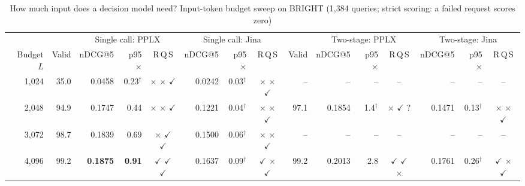 \begin{table}[t]
\centering
\caption{How much input does a decision model need? Input-token budget sweep on BRIGHT (1,384 queries; strict scoring: a failed request scores zero)}\label{tab:sweep}
\footnotesize\setlength{\tabcolsep}{2.6pt}
\begin{tabular}{@{}r r rrc rrc r rrc rrc@{}}\toprule
 & & \multicolumn{3}{c}{Single call: PPLX} & \multicolumn{3}{c}{Single call: Jina} & & \multicolumn{3}{c}{Two-stage: PPLX} & \multicolumn{3}{c}{Two-stage: Jina}\\\cmidrule(lr){3-5}\cmidrule(lr){6-8}\cmidrule(lr){10-12}\cmidrule(l){13-15}
Budget $L$ & Valid & nDCG@5 & p95$\times$ & R\,Q\,S & nDCG@5 & p95$\times$ & R\,Q\,S & Valid & nDCG@5 & p95$\times$ & R\,Q\,S & nDCG@5 & p95$\times$ & R\,Q\,S\\
\midrule
1,024 & 35.0 & 0.0458 & 0.23$^\dagger$ & \textcolor{cFail}{$\times$} \textcolor{cFail}{$\times$} \textcolor{cPass!70!black}{$\checkmark$} & 0.0242 & 0.03$^\dagger$ & \textcolor{cFail}{$\times$} \textcolor{cFail}{$\times$} \textcolor{cPass!70!black}{$\checkmark$} & \textcolor{black!30}{--} & \textcolor{black!30}{--} & \textcolor{black!30}{--} & \textcolor{black!30}{--} & \textcolor{black!30}{--} & \textcolor{black!30}{--} & \textcolor{black!30}{--}\\
2,048 & 94.9 & 0.1747 & 0.44 & \textcolor{cFail}{$\times$} \textcolor{cFail}{$\times$} \textcolor{cPass!70!black}{$\checkmark$} & 0.1221 & 0.04$^\dagger$ & \textcolor{cFail}{$\times$} \textcolor{cFail}{$\times$} \textcolor{cPass!70!black}{$\checkmark$} & 97.1 & 0.1854 & 1.4$^\dagger$ & \textcolor{cFail}{$\times$} \textcolor{cPass!70!black}{$\checkmark$} \textcolor{black!55}{?} & 0.1471 & 0.13$^\dagger$ & \textcolor{cFail}{$\times$} \textcolor{cFail}{$\times$} \textcolor{cPass!70!black}{$\checkmark$}\\
3,072 & 98.7 & 0.1839 & 0.69 & \textcolor{cFail}{$\times$} \textcolor{cPass!70!black}{$\checkmark$} \textcolor{cPass!70!black}{$\checkmark$} & 0.1500 & 0.06$^\dagger$ & \textcolor{cFail}{$\times$} \textcolor{cFail}{$\times$} \textcolor{cPass!70!black}{$\checkmark$} & \textcolor{black!30}{--} & \textcolor{black!30}{--} & \textcolor{black!30}{--} & \textcolor{black!30}{--} & \textcolor{black!30}{--} & \textcolor{black!30}{--} & \textcolor{black!30}{--}\\
4,096 & 99.2 & \textbf{0.1875} & \textbf{0.91} & \textcolor{cPass!70!black}{$\checkmark$} \textcolor{cPass!70!black}{$\checkmark$} \textcolor{cPass!70!black}{$\checkmark$} & 0.1637 & 0.09$^\dagger$ & \textcolor{cPass!70!black}{$\checkmark$} \textcolor{cFail}{$\times$} \textcolor{cPass!70!black}{$\checkmark$} & 99.2 & 0.2013 & 2.8 & \textcolor{cPass!70!black}{$\checkmark$} \textcolor{cPass!70!black}{$\checkmark$} \textcolor{cFail}{$\times$} & 0.1761 & 0.26$^\dagger$ & \textcolor{cPass!70!black}{$\checkmark$} \textcolor{cFail}{$\times$} \textcolor{cPass!70!black}{$\checkmark$}\\

\end{tabular}
\end{table}
